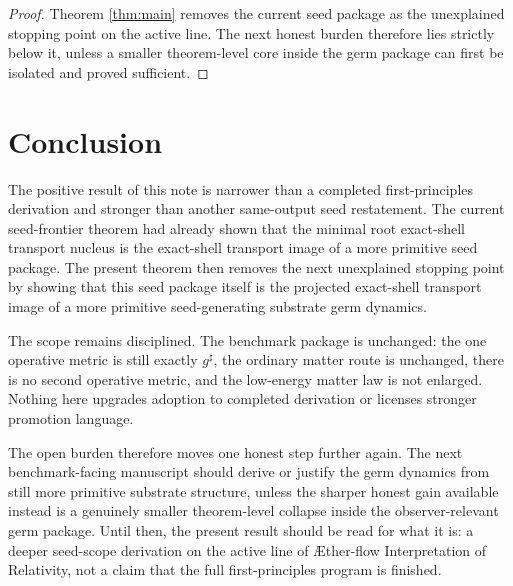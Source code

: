 \documentclass[11pt]{article}
\newcommand{\Aflow}{\AE{}ther-flow}
\newcommand{\TheoryName}{\Aflow{} Interpretation of Relativity}
\newcommand{\CompletedMetric}{g^{\sharp}}
\begin{document}
\begin{proof}
Theorem \ref{thm:main} removes the current seed package as the unexplained stopping point on the active line. The next honest burden therefore lies strictly below it, unless a smaller theorem-level core inside the germ package can first be isolated and proved sufficient.
\end{proof}

\section{Conclusion}

The positive result of this note is narrower than a completed first-principles derivation and stronger than another same-output seed restatement. The current seed-frontier theorem had already shown that the minimal root exact-shell transport nucleus is the exact-shell transport image of a more primitive seed package. The present theorem then removes the next unexplained stopping point by showing that this seed package itself is the projected exact-shell transport image of a more primitive seed-generating substrate germ dynamics.

The scope remains disciplined. The benchmark package is unchanged: the one operative metric is still exactly \(\CompletedMetric\), the ordinary matter route is unchanged, there is no second operative metric, and the low-energy matter law is not enlarged. Nothing here upgrades adoption to completed derivation or licenses stronger promotion language.

The open burden therefore moves one honest step further again. The next benchmark-facing manuscript should derive or justify the germ dynamics from still more primitive substrate structure, unless the sharper honest gain available instead is a genuinely smaller theorem-level collapse inside the observer-relevant germ package. Until then, the present result should be read for what it is: a deeper seed-scope derivation on the active line of \TheoryName{}, not a claim that the full first-principles program is finished.
\end{document}

